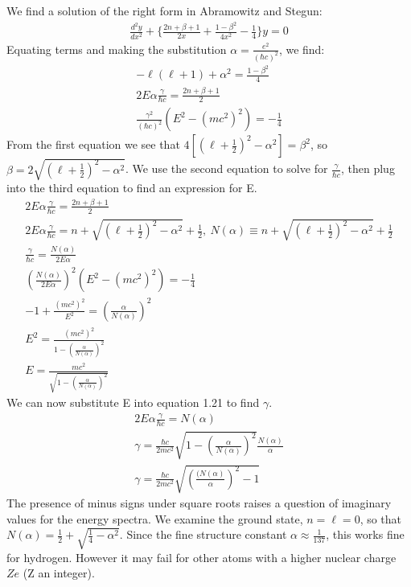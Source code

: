 \documentclass[a4paper,10pt]{article}
\numberwithin{equation}{section}
\begin{document}
We find a solution of the right form in Abramowitz and Stegun:
\begin{gather}
 \frac{d^2y}{dx^2}+\{\frac{2n+\beta +1}{2x}+\frac{1-\beta ^2}{4x^2}-\frac{1}{4} \}y=0
\end{gather}
Equating terms and making the substitution $\alpha=\frac{e^2}{(\hbar c)^2}$, we find:
\begin{gather}
  -\ell(\ell+1)+\alpha^2=\frac{1-\beta ^2}{4}\\
  2E\alpha \frac{\gamma}{\hbar c} =\frac{2n+\beta +1}{2}\\
 \frac{\gamma^2}{(\hbar c)^2}(E^2-(mc^2)^2)=-\frac{1}{4}
\end{gather}
From the first equation we see that $4[(\ell+\frac{1}{2})^2-\alpha ^2]=\beta^2$, so $\beta=2\sqrt{(\ell+\frac{1}{2})^2-\alpha ^2}$.
We use the second equation to solve for $\frac{\gamma}{\hbar c}$, then plug into the third equation to find an expression for E.
\begin{gather}
 2E\alpha \frac{\gamma}{\hbar c}=\frac{2n+\beta+1}{2}\\
 2E\alpha \frac{\gamma}{\hbar c}=n+\sqrt{(\ell+\frac{1}{2})^2-\alpha^2}+\frac{1}{2},\ 
 N(\alpha) \equiv n+\sqrt{(\ell+\frac{1}{2})^2-\alpha^2}+\frac{1}{2}\\
 \frac{\gamma}{\hbar c}=\frac{N(\alpha)}{2E\alpha}\\
 (\frac{N(\alpha)}{2E\alpha})^2(E^2-(mc^2)^2)=-\frac{1}{4}\\
 -1+\frac{(mc^2)^2}{E^2}=(\frac{\alpha}{N(\alpha)})^2\\
 E^2=\frac{(mc^2)^2}{1-(\frac{\alpha}{N(\alpha)})^2}\\
 E=\frac{mc^2}{\sqrt{1-(\frac{\alpha}{N(\alpha)})^2}}
\end{gather}
We can now substitute E into equation 1.21 to find $\gamma$.
\begin{gather}
 2E\alpha \frac{\gamma}{\hbar c}=N(\alpha)\\
 \gamma = \frac{\hbar c}{2mc^2}\sqrt{1-(\frac{\alpha}{N(\alpha)})^2}\frac{N(\alpha)}{\alpha}\\
 \gamma = \frac{\hbar c}{2mc^2}\sqrt{(\frac{(N(\alpha)}{\alpha})^2-1}
\end{gather}
The presence of minus signs under square roots raises a question of imaginary values for the energy spectra. 
We examine the ground state, $n=\ell=0$, so that $N(\alpha)=\frac{1}{2}+\sqrt{\frac{1}{4}-\alpha^2}$.
Since the fine structure constant $\alpha\approx\frac{1}{137}$, this works fine for hydrogen.
However it may fail for other atoms with a higher nuclear charge $Ze$ (Z an integer).
\end{document}
